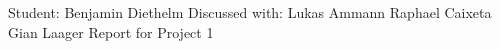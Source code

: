 \documentclass[unicode,10pt,a4paper,oneside,numbers=endperiod,openany]{scrartcl}
\begin{document}
\setassignment
{}

            {Student: Benjamin Diethelm}
            {Discussed with: Lukas Ammann \linebreak \null\hfill Raphael Caixeta \linebreak \null\hfill Gian Laager}
            {Report for Project 1}{}
\newline


\printbibliography
\end{document}
